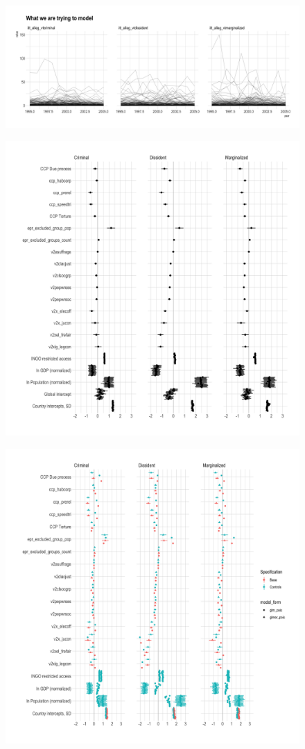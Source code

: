 \documentclass[12pt]{article}
\begin{document}
\begin{figure}
\includegraphics[width=.9\textwidth]{../output/figures/outcome-time-series.png}
\end{figure}

\begin{figure}
\includegraphics[width=.9\textwidth]{../output/figures/model-coefs.png}
\end{figure}

\begin{figure}
\includegraphics[width=.9\textwidth]{../output/figures/model-coefs-all-model-forms.png}
\end{figure}
\end{document}

